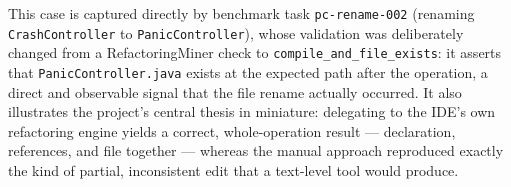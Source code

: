 This case is captured directly by benchmark task \texttt{pc-rename-002} (renaming
\texttt{CrashController} to \texttt{PanicController}), whose validation was
deliberately changed from a RefactoringMiner check to
\texttt{compile\_and\_file\_exists}: it asserts that \texttt{PanicController.java}
exists at the expected path after the operation, a direct and observable signal
that the file rename actually occurred. It also illustrates the project's central
thesis in miniature: delegating to the IDE's own refactoring engine yields a
correct, whole-operation result --- declaration, references, and file together
--- whereas the manual approach reproduced exactly the kind of partial,
inconsistent edit that a text-level tool would produce.
